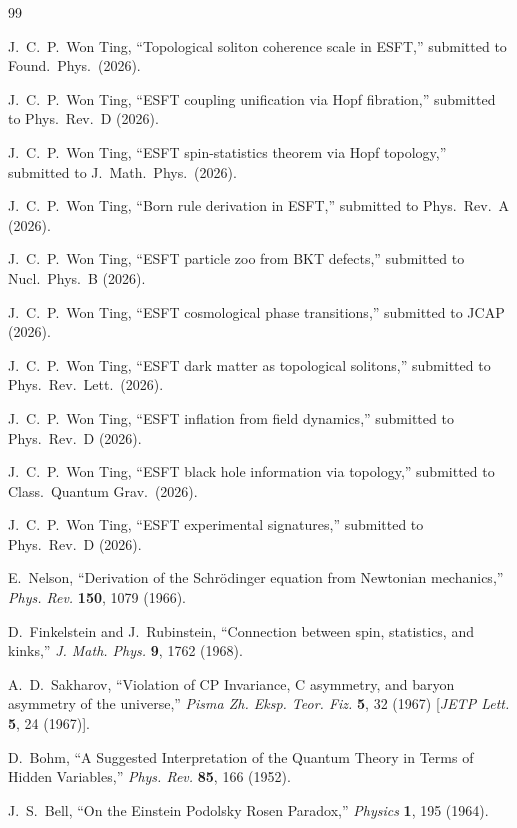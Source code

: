 ﻿\documentclass[twocolumn,showpacs,preprintnumbers,amsmath,amssymb,prd]{revtex4-2}
\begin{document}
\begin{thebibliography}{99}

 J.~C.~P.~Won Ting, ``Topological soliton coherence scale in ESFT,'' submitted to Found.\ Phys.\ (2026).

 J.~C.~P.~Won Ting, ``ESFT coupling unification via Hopf fibration,'' submitted to Phys.\ Rev.\ D (2026).

 J.~C.~P.~Won Ting, ``ESFT spin-statistics theorem via Hopf topology,'' submitted to J.\ Math.\ Phys.\ (2026).

 J.~C.~P.~Won Ting, ``Born rule derivation in ESFT,'' submitted to Phys.\ Rev.\ A (2026).

 J.~C.~P.~Won Ting, ``ESFT particle zoo from BKT defects,'' submitted to Nucl.\ Phys.\ B (2026).

 J.~C.~P.~Won Ting, ``ESFT cosmological phase transitions,'' submitted to JCAP (2026).

 J.~C.~P.~Won Ting, ``ESFT dark matter as topological solitons,'' submitted to Phys.\ Rev.\ Lett.\ (2026).

 J.~C.~P.~Won Ting, ``ESFT inflation from field dynamics,'' submitted to Phys.\ Rev.\ D (2026).

 J.~C.~P.~Won Ting, ``ESFT black hole information via topology,'' submitted to Class.\ Quantum Grav.\ (2026).

 J.~C.~P.~Won Ting, ``ESFT experimental signatures,'' submitted to Phys.\ Rev.\ D (2026).

E.~Nelson,
``Derivation of the Schrödinger equation from Newtonian mechanics,''
\emph{Phys. Rev.} \textbf{150}, 1079 (1966).

D.~Finkelstein and J.~Rubinstein,
``Connection between spin, statistics, and kinks,''
\emph{J. Math. Phys.} \textbf{9}, 1762 (1968).

A.~D.~Sakharov,
``Violation of CP Invariance, C asymmetry, and baryon asymmetry of the universe,''
\emph{Pisma Zh. Eksp. Teor. Fiz.} \textbf{5}, 32 (1967)
[\emph{JETP Lett.} \textbf{5}, 24 (1967)].

D.~Bohm,
``A Suggested Interpretation of the Quantum Theory in Terms of Hidden Variables,''
\emph{Phys. Rev.} \textbf{85}, 166 (1952).

J.~S.~Bell,
``On the Einstein Podolsky Rosen Paradox,''
\emph{Physics} \textbf{1}, 195 (1964).


\end{thebibliography}
\end{document}
